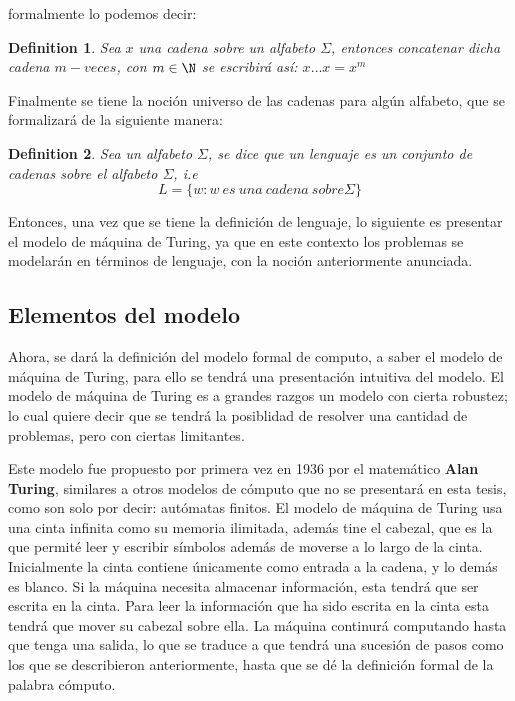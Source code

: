 \documentclass[10pt]{report}
\newtheorem{definition}{Definition}
\begin{document}
    formalmente lo podemos decir:\newline
    \begin{definition}
        Sea $x$ una cadena sobre un alfabeto $\Sigma$, entonces concatenar dicha cadena
        $m-veces$, con $m\in\N$ se escribirá así:\newline
        $x\dots x = x^m$
    \end{definition}
    Finalmente se tiene la noción universo de las cadenas para algún alfabeto, que se formalizará de la
    siguiente manera:
    \begin{definition}
        Sea un alfabeto $\Sigma$, se dice que un lenguaje es un conjunto de cadenas sobre el alfabeto $\Sigma$, i.e
        \begin{equation}
            \label{eq:equation7}
             L = \{w : w\ es \ una \ cadena\ sobre \Sigma \}
        \end{equation}
    \end{definition}
    Entonces, una vez que se tiene la definición de lenguaje, lo siguiente es presentar el modelo de máquina de Turing,
    ya que en este contexto los problemas se modelarán en términos de lenguaje, con la noción anteriormente anunciada.
    \newline

    \subsection{Elementos del modelo}\label{subsec:elementos-del-modelo-de-máquina-de-turing}
    Ahora, se dará la definición del modelo formal de computo, a saber el modelo de máquina de Turing,
    para ello se tendrá una presentación intuitiva del modelo.\newline
    El modelo de máquina de Turing es a grandes razgos un modelo con cierta robustez; lo cual quiere decir que se tendrá la posiblidad
    de resolver una cantidad de problemas, pero con ciertas limitantes.
    \newline

    Este modelo fue propuesto por primera vez en 1936 por el matemático \textbf{Alan Turing}, similares a
    otros modelos de cómputo que no se presentará en esta tesis, como son solo por decir: autómatas finitos.
    El modelo de máquina de Turing usa una cinta infinita como su memoria ilimitada,
    además tine el cabezal, que es la que permité leer y escribir símbolos además de moverse
    a lo largo de la cinta.
    \newline
    Inicialmente la cinta contiene únicamente como entrada a la cadena, y lo demás es blanco.
    Si la máquina necesita almacenar información, esta tendrá que ser escrita en la cinta.\newline
    Para leer la información que ha sido escrita en la cinta esta tendrá que mover su cabezal sobre ella.\space
    La máquina continurá computando hasta que tenga una salida, lo que se traduce a que tendrá una sucesión de pasos
    como los que se describieron anteriormente, hasta que se dé la definición formal de la palabra cómputo.
    \newline
\end{document}
